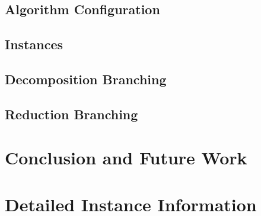 \documentclass[a4paper,UKenglish,cleveref, autoref, thm-restate]{lipics-v2021}
\begin{document}
\subsection{Algorithm Configuration}

\subsection{Instances}

\subsection{Decomposition Branching}

\subsection{Reduction Branching}

\section{Conclusion and Future Work}





\appendix

\section{Detailed Instance Information}
\end{document}
